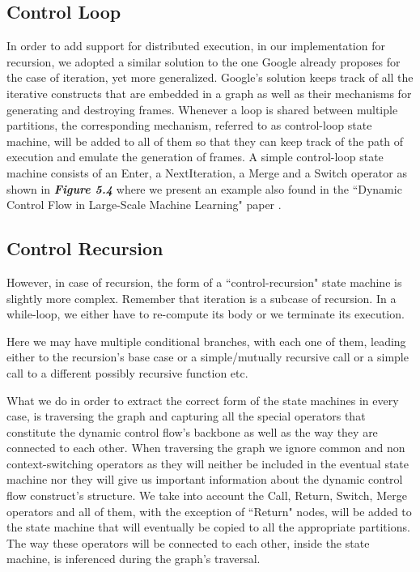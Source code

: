 \documentclass[ack,preface]{dithesis}
\begin{document}
    \subsection{Control Loop}
In order to add support for distributed execution, in our implementation for recursion, we adopted a similar solution to the one Google already proposes for the case of iteration, yet more generalized. Google's solution keeps track of all the iterative constructs that are embedded in a graph as well as their mechanisms for generating and destroying frames. Whenever a loop is shared between multiple partitions, the corresponding mechanism, referred to as control-loop state machine,  will be added to all of them so that they can keep track of the path of execution and emulate the generation of frames.
 A simple control-loop state machine consists of an Enter, a NextIteration, a Merge and a Switch operator as shown in  \textit{\textbf{Figure 5.4}} where we present an example also found in the ``Dynamic Control Flow in Large-Scale Machine Learning" paper \cite{Yu:2018}.

    \subsection{Control Recursion}
However, in case of recursion, the form of a ``control-recursion" state machine is slightly more complex.  Remember that iteration is a subcase of recursion. In a while-loop, we either have to re-compute its body or we terminate its execution.

Here we may have multiple conditional branches, with each one of them, leading either to the recursion's base case or a simple/mutually recursive call or a simple call to a different possibly recursive function etc. 

What we do in order to extract the correct form of the state machines in every case, is traversing the graph and capturing all the special operators that constitute the dynamic control flow's backbone as well as the way they are connected to each other. When traversing the graph we ignore common and non context-switching operators as they will neither be included in the eventual state machine nor they will give us important information about the dynamic control flow construct's structure. We take into account the Call, Return, Switch, Merge operators and all of them, with the exception of ``Return" nodes, will be added to the state machine that will eventually  be copied to all the appropriate partitions. The way these operators will be connected to each other, inside the state machine, is inferenced during the graph's traversal.
\end{document}

